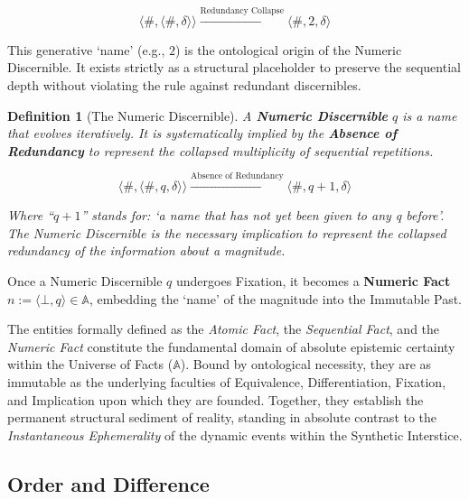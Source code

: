 \documentclass[11pt, a4paper]{article}
\theoremstyle{formalism}
\newtheorem{formalism}{Definition}
\begin{document}
\begin{equation}
    \langle \#, \langle \#, \delta \rangle \rangle \xrightarrow{\text{Redundancy Collapse}} \langle \#, 2, \delta \rangle
\end{equation}

This generative `name' (e.g., $2$) is the ontological origin of the Numeric
Discernible. It exists strictly as a structural placeholder to preserve the
sequential depth without violating the rule against redundant discernibles.

\begin{formalism}[The Numeric Discernible]

	A \textbf{Numeric Discernible} $q$ is a \textit{name}
	that evolves iteratively. It is systematically implied by the
	\textbf{Absence of Redundancy} to represent the collapsed 
	multiplicity of sequential repetitions. 
    
    \begin{equation}
        \langle \#, \langle \#, q, \delta \rangle \rangle \xrightarrow{\text{Absence of Redundancy}} \langle \#, q+1, \delta \rangle
    \end{equation}
    
	Where ``$q+1$'' stands for: `a name that has not yet been given to any q before'.
	The Numeric Discernible is the necessary implication to represent the
	collapsed redundancy of the information about a magnitude.

\end{formalism}

Once a Numeric Discernible $q$ undergoes Fixation, it becomes a \textbf{Numeric
Fact} $n := \langle \bot, q \rangle \in \mathbb{A}$, embedding the `name' of
the magnitude into the Immutable Past.

The entities formally defined as the \textit{Atomic Fact}, the \textit{Sequential
Fact}, and the \textit{Numeric Fact} constitute the fundamental domain of absolute
epistemic certainty within the Universe of Facts ($\mathbb{A}$). Bound by
ontological necessity, they are as immutable as the underlying faculties of
Equivalence, Differentiation, Fixation, and Implication upon which they are
founded. Together, they establish the permanent structural sediment of reality,
standing in absolute contrast to the \textit{Instantaneous Ephemerality} of the
dynamic events within the Synthetic Interstice.

\subsection{Order and Difference}
\end{document}
